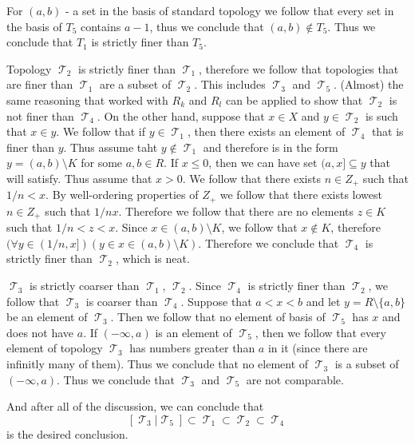 \documentclass[11pt,oneside,titlepage]{book}
\DeclareMathOperator \topol {\mathcal {T}}
\newcommand{\set}[1]{\{ #1 \}}
\begin{document}
For $(a, b)$ - a set in the basis of standard topology we follow that every set in the
basis of $T_5$ contains $a - 1$, thus we conclude that $(a, b) \notin T_5$. Thus we
conclude that $T_1$ is strictly finer than $T_5$.

Topology $\topol_2$ is strictly finer than $\topol_1$, therefore we follow that
topologies that are finer than $\topol_1$ are a subset of $\topol_2$. This includes
$\topol_3$ and $\topol_5$. (Almost) the same reasoning that worked with $R_k$ and $R_l$
can be applied to show that $\topol_2$ is not finer than $\topol_4$. On the other hand,
suppose that $x \in X$ and $y \in \topol_2$ is such that $x \in y$. We follow that
if $y \in \topol_1$, then there exists an element of $\topol_4$ that is finer than
$y$. Thus assume taht $y \notin \topol_1$ and therefore is in the form
$y = (a, b) \setminus K$ for some $a, b \in R$. If $x \leq 0$, then we can have
set $(a, x] \subseteq y$ that will satisfy. Thus assume that $x > 0$. We follow that there
exists $n \in Z_+$ such that $1/n < x$. By well-ordering properties of $Z_+$ we
follow that there exists lowest $n \in Z_+$ such that $1/n  x$. Therefore we follow that
there are no elements $z \in K$ such that $1/n < z < x$. Since $x \in (a, b) \setminus K$,
we follow that $x \notin K$, therefore
$(\forall y \in (1/n, x])(y \in x \in (a, b) \setminus K)$. Therefore we conclude that
$\topol_4$ is strictly finer than $\topol_2$, which is neat.

$\topol_3$ is strictly coarser than $\topol_1$, $\topol_2$. Since $\topol_4$
is strictly finer than $\topol_2$, we follow that $\topol_3$ is coarser than $\topol_4$.
Suppose that $a < x < b$ and let $y = R \setminus \set{a, b}$ be an element of $\topol_3$.
Then we follow that no element of basis of $\topol_5$ has $x$ and does not have $a$.
If $(-\infty, a)$ is an element of $\topol_5$, then we follow that every element of topology
$\topol_3$ has numbers greater than $a$ in it (since there are infinitly  many of them).
Thus we conclude that no element of $\topol_3$ is a subset of $(-\infty, a)$. Thus we
conclude that $\topol_3$ and $\topol_5$ are not comparable.

And after all of the discussion, we can conclude that
$$[\topol_3 | \topol_5] \subset \topol_1 \subset \topol_2 \subset \topol_4$$
is the desired conclusion.

\subsection{}
\end{document}
